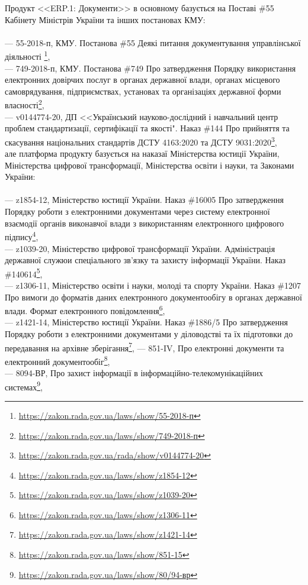 Продукт <<ERP.1: Документи>> в основному базується на Поставі \#55 Кабінету Міністрів України та інших постановах КМУ:
\\
\\
--- {55-2018-п}, КМУ. Постанова \#55 Деякі питання документування управлінської діяльності \footnote{\url{https://zakon.rada.gov.ua/laws/show/55-2018-п}},\\
--- {749-2018-п}, КМУ. Постанова \#749 Про затвердження Порядку використання електронних довірчих послуг в органах державної влади, органах місцевого самоврядування, підприємствах, установах та організаціях державної форми власності\footnote{\url{https://zakon.rada.gov.ua/laws/show/749-2018-п}},\\
--- {v0144774-20}, ДП <<Український науково-дослідний і навчальний центр проблем стандартизації, сертифікації та якості". Наказ \#144 Про прийняття та скасування національних стандартів ДСТУ 4163:2020 та ДСТУ 9031:2020\footnote{\url{https://zakon.rada.gov.ua/rada/show/v0144774-20}},\\

але платформа продукту базується на наказаї Міністерства юстиції України, Міністерства цифрової трансформації,
Міністерства освіти і науки, та Законами України:
\\
\\
--- {z1854-12}, Міністерство юстиції України. Наказ \#1600\/5 Про затвердження Порядку роботи з електронними документами через систему електронної взаємодії органів виконавчої влади з використанням електронного цифрового підпису\footnote{\url{https://zakon.rada.gov.ua/laws/show/z1854-12}},\\
--- {z1039-20}, Міністерство цифрової трансформації України. Адміністрація державної служюи спеціального зв'язку та захисту інформації України. Наказ \#140\/614\footnote{\url{https://zakon.rada.gov.ua/laws/show/z1039-20}},\\
--- {z1306-11}, Міністерство освіти і науки, молоді та спорту України. Наказ \#1207 Про вимоги до форматів даних електронного документообігу в органах державної влади. Формат електронного повідомлення\footnote{\url{https://zakon.rada.gov.ua/laws/show/z1306-11}},\\
--- {z1421-14}, Міністерство юстиції України. Наказ \#1886/5 Про затвердження Порядку роботи з електронними документами у діловодстві та їх підготовки до передавання на архівне зберігання\footnote{\url{https://zakon.rada.gov.ua/laws/show/z1421-14}},
--- {851-IV}, Про електронні документи та електронний документообіг\footnote{\url{https://zakon.rada.gov.ua/laws/show/851-15}},\\
--- {80\/94-ВР}, Про захист інформації в інформаційно-телекомунікаційних системах\footnote{\url{https://zakon.rada.gov.ua/laws/show/80/94-вр}},

